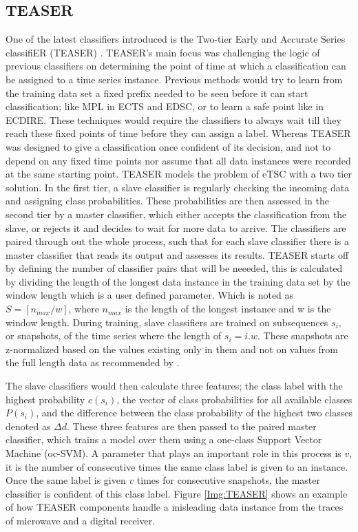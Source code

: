 \subsection{TEASER}
\label{SubsectionTEASER}
One of the latest classifiers introduced is the Two-tier Early and Accurate Series classifiER (TEASER) \cite{schafer2020teaser}.
TEASER's main focus was challenging the logic of previous classifiers on determining the point of time at which a classification can be assigned to a time series instance.
Previous methods would try to learn from the training data set a fixed prefix needed to be seen before it can start classification; like MPL in ECTS and EDSC, or to learn a safe point like in ECDIRE.
These techniques would require the classifiers to always wait till they reach these fixed points of time before they can assign a label.
Whereas TEASER was designed to give a classification once confident of its decision, and not to depend on any fixed time points nor assume that all data instances were recorded
at the same starting point.
TEASER models the problem of eTSC with a two tier solution. In the first tier, a slave classifier is regularly checking the incoming data and assigning class probabilities.
These probabilities are then assessed in the second tier by a master classifier, which either accepts the classification from the slave, or rejects it and decides to wait for more data to arrive.
The classifiers are paired through out the whole process, such that for each slave classifier there is a master classifier that reads its output and assesses its results.
TEASER starts off by defining the number of classifier pairs that will be neeeded, this is calculated by dividing the length of the longest data instance in the training data set
by the window length which is a user defined parameter. Which is noted as $S = [n_{max}/w]$, where $n_{max}$ is the length of the longest instance and w is the window length.
During training, slave classifiers are trained on subsequences $s_{i}$, or snapshots, of the time series where the length of $s_{i} = i . w $. These snapshots are z-normalized based on
the values existing only in them and not on values from the full length data as recommended by \cite{mori2017early}.

The slave classifiers would then calculate three features; the class label with the highest probability $c(s_{i})$, the vector of class probabilities for all available classes $P(s_{i})$,
and the difference between the class probability of the highest two classes denoted as $\Delta d$.
These three features are then passed to the paired master classifier, which trains a model over them using a one-class Support Vector Machine (oc-SVM).
A parameter that plays an important role in this process is $v$, it is the number of consecutive times the same class label is given to an instance.
Once the same label is given $v$ times for consecutive snapshots, the master classifier is confident of this class label.
Figure \ref{Img:TEASER} shows an example of how TEASER components handle a misleading data instance from the traces of microwave and a digital receiver.


